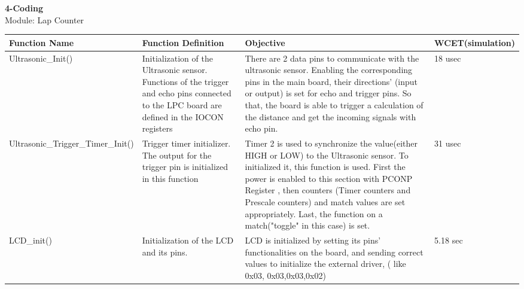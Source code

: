 \documentclass{article}
\begin{document}
\clearpage
{\huge\textbf {4-Coding}}
\\
{\huge {Module: Lap Counter}}
\\
\begin{tabular}{| C{4cm} | C{4cm} | C{4cm} | C{2cm} |}
\hline
\textbf{Function Name} &\textbf{Function Definition}  & \textbf{Objective} &\textbf{WCET}\linebreak(simulation)\\
\hline
Ultrasonic\_Init() & Initialization of the Ultrasonic sensor. Functions of the trigger
and echo pins connected to the LPC board are defined in the IOCON registers& There are 2 data pins to
communicate with the ultrasonic sensor. Enabling the corresponding pins in the main board, their directions'
(input or output) is set for echo and trigger pins. So that, the board is able to trigger a calculation
of the distance and get the incoming signals with echo pin.& 18 usec\\
\hline
Ultrasonic\_Trigger\_Timer\_Init()&Trigger timer initializer. The output for the trigger pin is
 initialized in this function & Timer 2 is used to synchronize the value(either HIGH or LOW) to the Ultrasonic
 sensor. To initialized it, this function is used. First the power is enabled to this section with PCONP Register
 , then counters (Timer counters and Prescale counters) and match values are set appropriately. Last, the
 function on a match("toggle" in this case) is set. & 31 usec\\
\hline
LCD\_init()&Initialization of the LCD and its pins.& LCD is initialized by setting its pins' functionalities on the board,
and sending correct values to initialize the external driver, ( like 0x03, 0x03,0x03,0x02)&5.18 sec\\
\hline
\end{tabular}
\end{document}
